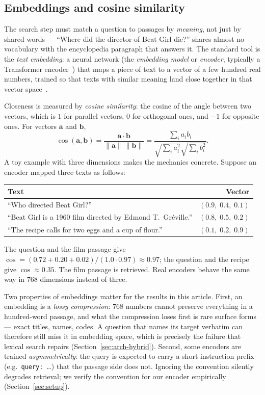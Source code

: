 \subsection{Embeddings and cosine similarity}
\label{sec:embeddings}

The search step must match a question to passages by \emph{meaning}, not
just by shared words --- ``Where did the director of Beat Girl die?'' shares
almost no vocabulary with the encyclopedia paragraph that answers it. The
standard tool is the \emph{text embedding}: a neural network (the
\emph{embedding model} or \emph{encoder}, typically a Transformer
encoder~\citep{vaswani2017attention,devlin2019bert}) that maps a piece of
text to a vector of a few hundred real numbers, trained so that texts
with similar meaning land close together in that vector
space~\citep{reimers2019sbert}.

Closeness is measured by \emph{cosine similarity}: the cosine of the angle
between two vectors, which is $1$ for parallel vectors, $0$ for orthogonal
ones, and $-1$ for opposite ones. For vectors $\mathbf{a}$ and $\mathbf{b}$,
\begin{equation}
\cos(\mathbf{a},\mathbf{b})
  = \frac{\mathbf{a}\cdot\mathbf{b}}{\lVert\mathbf{a}\rVert\,\lVert\mathbf{b}\rVert}
  = \frac{\sum_i a_i b_i}{\sqrt{\sum_i a_i^2}\sqrt{\sum_i b_i^2}}.
\end{equation}
A toy example with three dimensions makes the mechanics concrete. Suppose an
encoder mapped three texts as follows:
\begin{center}
\small
\begin{tabular}{lr}
\toprule
Text & Vector \\
\midrule
``Who directed Beat Girl?'' & $(0.9,\; 0.4,\; 0.1)$ \\
``Beat Girl is a 1960 film directed by Edmond T.\ Gr\'eville.'' & $(0.8,\; 0.5,\; 0.2)$ \\
``The recipe calls for two eggs and a cup of flour.'' & $(0.1,\; 0.2,\; 0.9)$ \\
\bottomrule
\end{tabular}
\end{center}
The question and the film passage give
$\cos = (0.72+0.20+0.02)/(1.0\cdot0.97) \approx 0.97$; the question and the
recipe give $\cos \approx 0.35$. The film passage is retrieved. Real
encoders behave the same way in 768 dimensions instead of three.

Two properties of embeddings matter for the results in this article. First,
an embedding is a \emph{lossy compression}: 768 numbers cannot preserve
everything in a hundred-word passage, and what the compression loses first
is rare surface forms --- exact titles, names, codes. A question that names
its target verbatim can therefore still miss it in embedding space, which
is precisely the failure that lexical search repairs
(Section~\ref{sec:arch-hybrid}). Second, some encoders are trained
\emph{asymmetrically}: the query is expected to carry a short instruction
prefix (e.g.\ \texttt{query:}~\ldots) that the passage side does not.
Ignoring the convention silently degrades retrieval; we verify the
convention for our encoder empirically (Section~\ref{sec:setup}).

